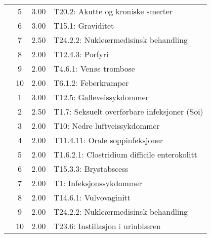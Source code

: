 \begin{table}[htbp]
\begin{tabular}{c c c l}
     & 5 & 3.00 & T20.2: Akutte og kroniske smerter \\
     & 6 & 3.00 & T15.1: Graviditet \\
     & 7 & 2.50 & T24.2.2: Nukleærmedisinsk behandling \\
     & 8 & 2.00 & T12.4.3: Porfyri \\
     & 9 & 2.00 & T4.6.1: Venøs trombose \\
     & 10 & 2.00 & T6.1.2: Feberkramper \\
	\addlinespace
    8 & 1 & 3.00 & T12.5: Galleveissykdommer \\
     & 2 & 2.50 & T1.7: Seksuelt overførbare infeksjoner (Soi) \\
     & 3 & 2.00 & T10: Nedre luftveissykdommer \\
     & 4 & 2.00 & T11.4.11: Orale soppinfeksjoner \\
     & 5 & 2.00 & T1.6.2.1: Clostridium difficile enterokolitt \\
     & 6 & 2.00 & T15.3.3: Brystabscess \\
     & 7 & 2.00 & T1: Infeksjonssykdommer \\
     & 8 & 2.00 & T14.6.1: Vulvovaginitt \\
     & 9 & 2.00 & T24.2.2: Nukleærmedisinsk behandling \\
     & 10 & 2.00 & T23.6: Instillasjon i urinblæren \\
	\bottomrule
\end{tabular}
\end{table}

